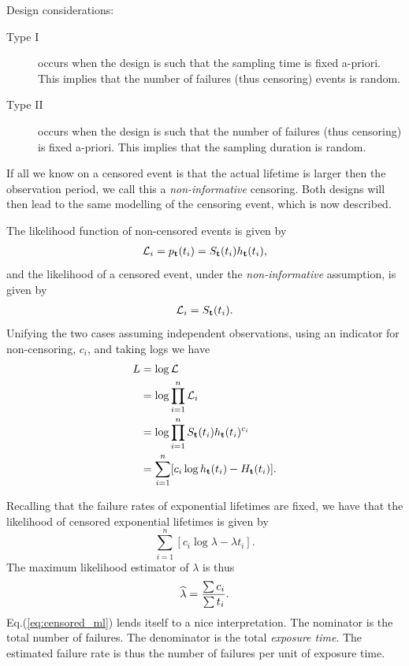 Design considerations:
\begin{description}
\item [Type I] occurs when the design is such that the sampling time is fixed a-priori. This implies that the number of failures (thus censoring) events is random. 
\item [Type II] occurs when the design is such that the number of failures (thus censoring) is fixed a-priori. This implies that the sampling duration is random.
\end{description}
If all we know on a censored event is that the actual lifetime is larger then the observation period, we call this a \emph{non-informative} censoring. 
Both designs will then lead to the same modelling of the censoring event, which is now described.

The likelihood function of non-censored events is given by
\begin{align}
	\mathcal{L}_i=p_{\mathbf{t}}(t_i)= S_{\mathbf{t}} (t_i) h_{\mathbf{t}} (t_i),
\end{align}
and the likelihood of a censored event, under the \emph{non-informative} assumption, is given by 
\begin{align}
	\mathcal{L}_i=S_{\mathbf{t}} (t_i) .
\end{align}
Unifying the two cases assuming independent observations, using an indicator for non-censoring, $c_i$, and taking logs we have
\begin{align}
	L &=\log \mathcal{L}\\ 
	&= \log \prod_{i=1}^{n} \mathcal{L}_i \\
	&= \log \prod_{i=1}^{n} S_{\mathbf{t}} (t_i) h_{\mathbf{t}} (t_i)^{c_i} \\
	&= \sum_{i=1}^{n} [c_i \log h_{\mathbf{t}} (t_i) - H_{\mathbf{t}} (t_i)]. \label{eq:censored_likelihood}
\end{align}


\begin{example}
Recalling that the failure rates of exponential lifetimes are fixed, we have that the likelihood of censored exponential lifetimes is given by 
$$
	\sum_{i=1}^{n} [c_i \log \lambda - \lambda t_i].
$$
The maximum likelihood estimator of $\lambda$ is thus
\begin{align}
	\widehat{\lambda}= \frac{\sum c_i}{\sum t_i}. \label{eq:censored_ml}
\end{align}
Eq.(\ref{eq:censored_ml}) lends itself to a nice interpretation.
The nominator is the total number of failures.
The denominator is the total \emph{exposure time}. 
The estimated failure rate is thus the number of failures per unit of exposure time. 
\end{example}




